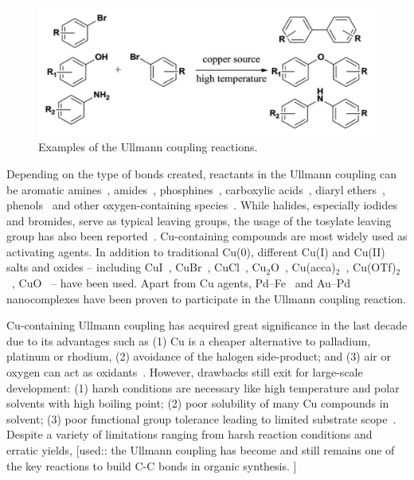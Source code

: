 \documentclass[%
 reprint,
 amsmath,amssymb,
 aps,
prb,
]{revtex4-2}
\begin{document}
\begin{figure}[htb]
\centering
\includegraphics[width=0.90\columnwidth]{Fig/classical.png}
\caption{Examples of the Ullmann coupling reactions.}
\label{fig:UllmannCoupling}
\end{figure}

Depending on the type of bonds created, reactants in the Ullmann coupling can be aromatic amines~\cite{ullmann_17,ullmann_18}, amides~\cite{ullmann_19,ullmann_20}, phosphines~\cite{ullmann_21,ullmann_22}, carboxylic acids~\cite{ullmann_23}, diaryl ethers~\cite{ullmann_24}, phenols~\cite{ullmann_25} and other oxygen-containing species~\cite{ullmann_26,ullmann_27,ullmann_28}. 
While halides, especially iodides and bromides, serve as typical leaving groups, the usage of the tosylate leaving group has also been reported~\cite{ullmann_15}. 
Cu-containing compounds are most widely used as activating agents. In addition to traditional Cu(0), different Cu(I) and Cu(II) salts and oxides -- including CuI~\cite{ullmann_07,ullmann_08,ullmann_09}, CuBr~\cite{ullmann_10,ullmann_11}, CuCl~\cite{ullmann_13}, Cu$_2$O~\cite{ullmann_12}, Cu(acca)$_2$~\cite{ullmann_14}, Cu(OTf)$_2$~\cite{ullmann_15}, CuO~\cite{ullmann_16} -- have been used. 
Apart from Cu agents, Pd--Fe~\cite{ullmann_35} and Au--Pd~\cite{ullmann_36} nanocomplexes have been proven to participate in the Ullmann coupling reaction. 

Cu-containing Ullmann coupling has acquired great significance in the last decade due to its advantages such as (1) Cu is a cheaper alternative to palladium, platinum or rhodium,  (2) avoidance of the halogen side-product; and (3) air or oxygen can act as oxidants~\cite{ullmann_38,ullmann_39,ullmann_40,ullmann_41}. However, drawbacks still exit for large-scale development: (1) harsh conditions are necessary like high temperature and polar solvents with high boiling point; (2) poor solubility of many Cu compounds in solvent; (3) poor functional group tolerance leading to limited substrate scope~\cite{ullmann_31}. Despite a variety of limitations ranging from harsh reaction conditions and erratic yields, [used:: the Ullmann coupling has become and still remains one of the key reactions to build C-C bonds in organic synthesis. ]
\end{document}
